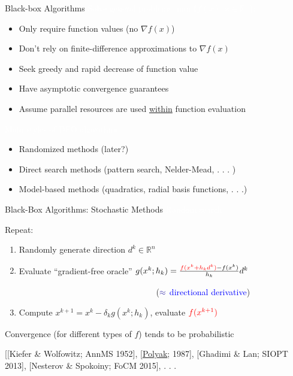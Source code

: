 \documentclass[handout,aspectratio=54]{beamer}
\numberwithin{theorem}{section}
\begin{document}
\begin{frame}{Black-box Algorithms}
\colorbox[rgb]{0.5,0.6,0.7}{\textcolor{white}{Solve general problems $\min\{f(x):x\in \mathbb{R}^n\}$:}}
\begin{itemize}
\item Only require function values (no $\nabla f(x)$)
\item  Don't rely on finite-difference approximations to $\nabla f(x)$
\item Seek greedy and rapid decrease of function value
\item Have asymptotic convergence guarantees
\item  Assume parallel resources are used \underline{within} function evaluation
\end{itemize}

\colorbox[rgb]{0.5,0.6,0.7}{\textcolor{white}{Main styles of DFO algorithms}}
\begin{itemize}
\item Randomized methods (later?)
\item Direct search methods (pattern search, Nelder-Mead, . . . )
\item Model-based methods (quadratics, radial basis functions, . . .) 
\end{itemize}
\end{frame}

\begin{frame}{Black-Box Algorithms: Stochastic Methods}
\colorbox[rgb]{0.5,0.6,0.7}{\textcolor{white}{Random search}}

Repeat:
\begin{enumerate}
\item Randomly generate direction $d^k\in\mathbb{R}^n$
\item  Evaluate “gradient-free oracle” $g(x^k;h_k)=\frac{\textcolor{red}{f(x^k+h_kd^k)}-f(x^k)}{h_k}d^k$

$\qquad\qquad\qquad\qquad\qquad\qquad\qquad\qquad$ ($\textcolor{blue}{\approx }$ \textcolor{blue}{directional derivative})

\item Compute $x^{k+1}=x^k-\delta_k g(x^k;h_k)$, evaluate $\textcolor{red}{f(x^{k+1})}$
\end{enumerate}
Convergence (for different types of $f$) tends to be probabilistic

\scriptsize
\textcolor[RGB]{128,0,128}{[[Kiefer \& Wolfowitz; AnnMS 1952], [\underline{Polyak}; 1987], [Ghadimi \& Lan; SIOPT 2013], [Nesterov \& Spokoiny; FoCM 2015], . . .}

\vspace{2.5cm}
\end{frame}
\end{document}
